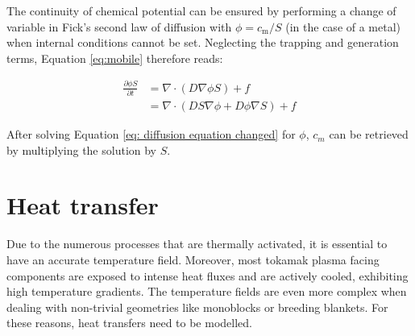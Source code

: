 



The continuity of chemical potential can be ensured by performing a change of variable in Fick's second law of diffusion with $\phi = c_\mathrm{m}/S$ (in the case of a metal)  when internal conditions cannot be set.
Neglecting the trapping and generation terms, Equation \ref{eq:mobile} therefore reads:

\begin{align}
    \frac{\partial \phi S}{\partial t} &= \nabla \cdot\left(D \nabla \phi S\right) + f \nonumber \\
    &=\nabla \cdot\left( D S \nabla \phi + D \phi \nabla S\right) + f \label{eq: diffusion equation changed}
\end{align}



After solving Equation \ref{eq: diffusion equation changed} for $\phi$, $c_m$ can be retrieved by multiplying the solution by $S$.

\section{Heat transfer}
Due to the numerous processes that are thermally activated, it is essential to have an accurate temperature field.
Moreover, most tokamak plasma facing components are exposed to intense heat fluxes and are actively cooled, exhibiting high temperature gradients.
The temperature fields are even more complex when dealing with non-trivial geometries like monoblocks or breeding blankets.
For these reasons, heat transfers need to be modelled.

